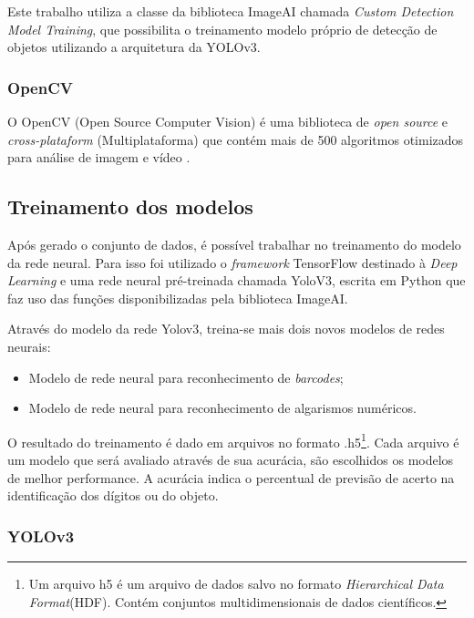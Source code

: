 Este trabalho utiliza a classe da biblioteca ImageAI chamada \textit{Custom Detection Model Training}, que possibilita o treinamento modelo próprio de detecção de objetos utilizando a arquitetura da YOLOv3.


\subsubsection{OpenCV}

O OpenCV (Open Source Computer Vision) é uma biblioteca de \textit{open source} e \textit{cross-plataform} (Multiplataforma) que contém mais de 500 algoritmos otimizados para análise de imagem e vídeo \cite{opencv}.


\subsection{Treinamento dos modelos}

Após gerado o conjunto de dados, é possível trabalhar no treinamento do modelo da rede neural. Para isso foi utilizado o \textit{framework} TensorFlow destinado à \textit{Deep Learning} e uma rede neural pré-treinada chamada YoloV3, escrita em Python que faz uso das funções disponibilizadas pela biblioteca ImageAI.

Através do modelo da rede Yolov3, treina-se mais dois novos modelos de redes neurais:
\begin{itemize}
    \item Modelo de rede neural para reconhecimento de \textit{barcodes};
    \item Modelo de rede neural para reconhecimento de algarismos numéricos.
\end{itemize}

O resultado do treinamento é dado em arquivos no formato .h5\footnote{Um arquivo h5 é um arquivo de dados salvo no formato \textit{Hierarchical Data Format}(HDF). Contém conjuntos multidimensionais de dados científicos.}. Cada arquivo é um modelo que será avaliado através de sua acurácia, são escolhidos os modelos de melhor performance.  A acurácia indica o percentual de previsão de acerto na identificação dos dígitos ou do objeto.


\subsubsection*{YOLOv3}\label{sub:Yolov3}

